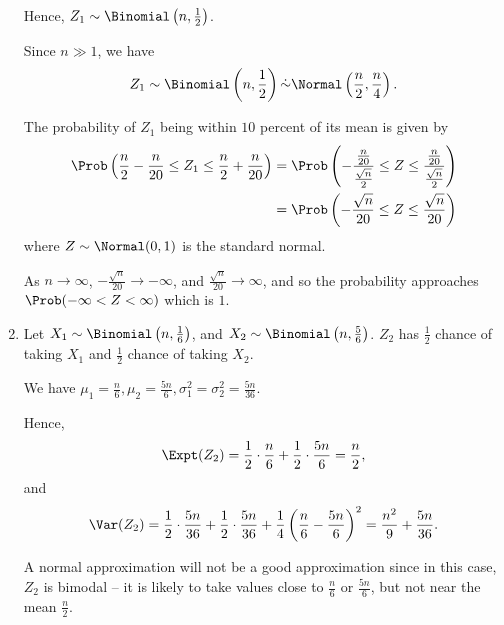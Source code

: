 \begin{enumerate}
          Hence, \(Z_1 \sim \Binomial\left(n, \frac{1}{2}\right)\).

          Since \(n \gg 1\), we have
          \[
              Z_1 \sim \Binomial\left(n, \frac{1}{2}\right) \dot{\sim} \Normal\left(\frac{n}{2}, \frac{n}{4}\right).
          \]

          The probability of \(Z_1\) being within \(10\) percent of its mean is given by
          \begin{align*}
              \Prob\left(\frac{n}{2} - \frac{n}{20} \leq Z_1 \leq \frac{n}{2} + \frac{n}{20}\right) & = \Prob \left(- \frac{\frac{n}{20}}{\frac{\sqrt{n}}{2}} \leq Z \leq \frac{\frac{n}{20}}{\frac{\sqrt{n}}{2}}\right) \\
                                                                                                    & = \Prob\left(- \frac{\sqrt{n}}{20} \leq Z \leq \frac{\sqrt{n}}{20}\right)
          \end{align*}
          where \(Z \sim \Normal(0, 1)\) is the standard normal.

          As \(n \to \infty\), \(- \frac{\sqrt{n}}{20} \to -\infty\), and \(\frac{\sqrt{n}}{20} \to \infty\), and so the probability approaches \(\Prob(-\infty < Z < \infty)\) which is \(1\).

    \item Let \(X_1 \sim \Binomial \left(n, \frac{1}{6}\right)\), and \(X_2 \sim \Binomial \left(n, \frac{5}{6}\right)\). \(Z_2\) has \(\frac{1}{2}\) chance of taking \(X_1\) and \(\frac{1}{2}\) chance of taking \(X_2\).

          We have \(\mu_1 = \frac{n}{6}, \mu_2 = \frac{5n}{6}, \sigma^2_1 = \sigma^2_2 = \frac{5n}{36}\).

          Hence,
          \[
              \Expt(Z_2) = \frac{1}{2} \cdot \frac{n}{6} + \frac{1}{2} \cdot \frac{5n}{6} = \frac{n}{2},
          \]
          and
          \[
              \Var(Z_2) = \frac{1}{2} \cdot \frac{5n}{36} + \frac{1}{2} \cdot \frac{5n}{36} + \frac{1}{4} \left(\frac{n}{6} - \frac{5n}{6}\right)^2 = \frac{n^2}{9} + \frac{5n}{36}.
          \]

          A normal approximation will not be a good approximation since in this case, \(Z_2\) is bimodal -- it is likely to take values close to \(\frac{n}{6}\) or \(\frac{5n}{6}\), but not near the mean \(\frac{n}{2}\).


\end{enumerate}
